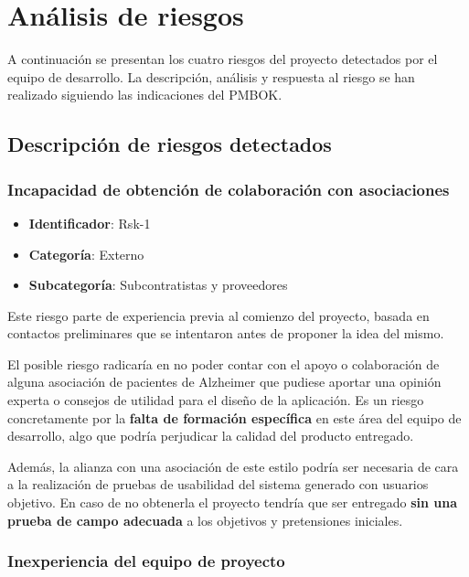 \chapter{Análisis de riesgos}
\label{ch:analisis_riesgos}

A continuación se presentan los cuatro riesgos del proyecto detectados por el equipo de desarrollo. La descripción, análisis y respuesta al riesgo se han realizado siguiendo las indicaciones del PMBOK\cite{pmbok2013}.

\section{Descripción de riesgos detectados}

\subsection{Incapacidad de obtención de colaboración con asociaciones}

\begin{itemize}
    \item \textbf{Identificador}: Rsk-1
    \item \textbf{Categoría}: Externo
    \item \textbf{Subcategoría}: Subcontratistas y proveedores
\end{itemize}

Este riesgo parte de experiencia previa al comienzo del proyecto, basada en contactos preliminares que se intentaron antes de proponer la idea del mismo. 

El posible riesgo radicaría en no poder contar con el apoyo o colaboración de alguna asociación de pacientes de Alzheimer que pudiese aportar una opinión experta o consejos de utilidad para el diseño de la aplicación. Es un riesgo concretamente por la \textbf{falta de formación específica} en este área del equipo de desarrollo, algo que podría perjudicar la calidad del producto entregado.

Además, la alianza con una asociación de este estilo podría ser necesaria de cara a la realización de pruebas de usabilidad del sistema generado con usuarios objetivo. En caso de no obtenerla el proyecto tendría que ser entregado \textbf{sin una prueba de campo adecuada} a los objetivos y pretensiones iniciales.


\vspace{20pt}
\subsection{Inexperiencia del equipo de proyecto}

